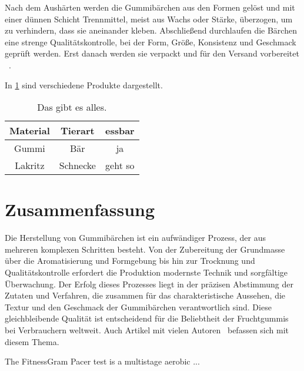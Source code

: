 \documentclass[ngerman]{seminarvorlage}
\begin{document}
Nach dem Aushärten werden die Gummibärchen aus den Formen gelöst und mit einer dünnen Schicht Trennmittel, meist aus Wachs oder Stärke, überzogen, um zu verhindern, dass sie aneinander kleben. Abschließend durchlaufen die Bärchen eine strenge Qualitätskontrolle, bei der Form, Größe, Konsistenz und Geschmack geprüft werden. Erst danach werden sie verpackt und für den Versand vorbereitet ~\cite{Black1988}.


In \cref{tttabelle} sind verschiedene Produkte dargestellt.


\begin{table}[htbp]
\begin{center}
\begin{tabular}{|c|c|c|}
\hline
Material & Tierart & essbar\\
\hline
Gummi & Bär & ja\\
Lakritz & Schnecke & geht so\\
\hline
\end{tabular}
\end{center}
\caption{Das gibt es alles.}
\label{tttabelle}
\end{table}

\section{Zusammenfassung}
Die Herstellung von Gummibärchen ist ein aufwändiger Prozess, der aus mehreren komplexen Schritten besteht. Von der Zubereitung der Grundmasse über die Aromatisierung und Formgebung bis hin zur Trocknung und Qualitätskontrolle erfordert die Produktion modernste Technik und sorgfältige Überwachung. Der Erfolg dieses Prozesses liegt in der präzisen Abstimmung der Zutaten und Verfahren, die zusammen für das charakteristische Aussehen, die Textur und den Geschmack der Gummibärchen verantwortlich sind. Diese gleichbleibende Qualität ist entscheidend für die Beliebtheit der Fruchtgummis bei Verbrauchern weltweit. Auch Artikel mit vielen Autoren~\cite{Black1988}
befassen sich mit diesem Thema.


The FitnessGram Pacer test is a multistage aerobic ...

%
%


\end{document}
